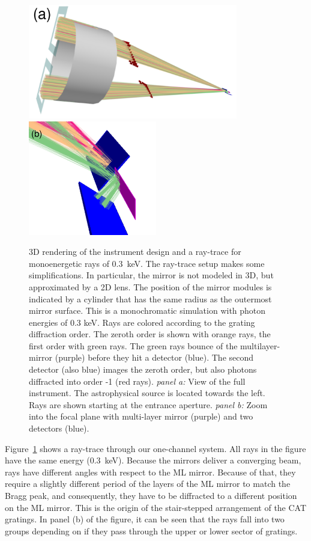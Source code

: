 \documentclass[]{spie}  %
\begin{document}
\begin{figure} [ht]
  \begin{center}
    \includegraphics[height=5cm]{3D.pdf}
    \includegraphics[height=5cm]{3Ddetector.pdf}
  \end{center}
  \caption
      { \label{fig:3d}3D rendering of the instrument design and a
        ray-trace for monoenergetic rays of 0.3~keV. The ray-trace
        setup makes some simplifications. In particular, the mirror is
        not modeled in 3D, but approximated by a 2D lens. The position
        of the mirror modules is indicated by a cylinder that has the
        same radius as the outermost mirror surface. This is a
        monochromatic simulation with photon energies of 0.3 keV. Rays
        are colored according to the grating diffraction order. The
        zeroth order is shown with orange rays, the first order with
        green rays. The green rays bounce of the multilayer-mirror
        (purple) before they hit a detector (blue). The second
        detector (also blue) images the zeroth order, but also photons
        diffracted into order -1 (red rays). \emph{panel a:} View of
        the full instrument. The astrophysical source is located
        towards the left. Rays are shown starting at the entrance
        aperture. \emph{panel b:} Zoom into the focal plane with
        multi-layer mirror (purple) and two detectors (blue).  }
\end{figure}

Figure~\ref{fig:3d} shows a ray-trace through our one-channel
system. All rays in the figure have the same energy (0.3~keV). Because
the mirrors deliver a converging beam, rays have different angles with
respect to the ML mirror. Because of that, they require a slightly
different period of the layers of the ML mirror to match the Bragg
peak, and consequently, they have to be diffracted to a different
position on the ML mirror. This is the origin of the stair-stepped
arrangement of the CAT gratings\cite{redsox,redsoxtrace}. In panel
(b) of the figure, it can be seen that the rays fall into two groups
depending on if they pass through the upper or lower sector of
gratings.
\end{document}
